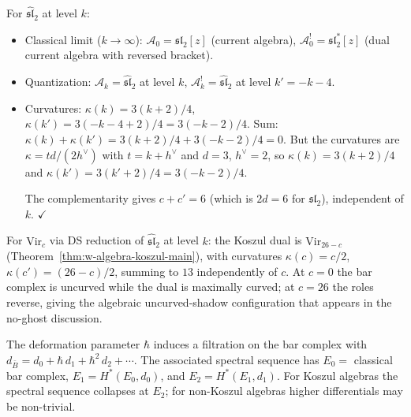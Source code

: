 \begin{computation}
\label{comp:dq-koszul-km}

For $\widehat{\mathfrak{sl}}_2$ at level $k$:
\begin{itemize}
\item Classical limit ($k \to \infty$):
$\mathcal{A}_0 = \mathfrak{sl}_2[z]$ (current algebra),
$\mathcal{A}_0^! = \mathfrak{sl}_2^*[z]$
(dual current algebra with reversed bracket).
\item Quantization: $\mathcal{A}_k = \widehat{\mathfrak{sl}}_2$ at
level $k$, $\mathcal{A}_k^! = \widehat{\mathfrak{sl}}_2$ at
level $k' = -k-4$.
\item Curvatures: $\kappa(k) = 3(k+2)/4$, $\kappa(k') = 3(-k-4+2)/4 = 3(-k-2)/4$.
Sum: $\kappa(k) + \kappa(k') = 3(k+2)/4 + 3(-k-2)/4 = 0$.
But the curvatures are $\kappa = td/(2h^\vee)$ with $t = k + h^\vee$
and $d = 3$, $h^\vee = 2$, so $\kappa(k) = 3(k+2)/4$ and
$\kappa(k') = 3(k'+2)/4 = 3(-k-2)/4$.

The complementarity gives $c + c' = 6$ (which is $2d = 6$ for
$\mathfrak{sl}_2$), independent of $k$. $\checkmark$
\end{itemize}
\end{computation}

\begin{computation}
\label{comp:dq-koszul-vir}
For $\mathrm{Vir}_c$ via DS reduction of $\widehat{\mathfrak{sl}}_2$ at level $k$: the Koszul dual is $\mathrm{Vir}_{26-c}$ (Theorem~\ref{thm:w-algebra-koszul-main}), with curvatures $\kappa(c)=c/2$, $\kappa(c')=(26-c)/2$, summing to $13$ independently of $c$. At $c=0$ the bar complex is uncurved while the dual is maximally curved; at $c=26$ the roles reverse, giving the algebraic uncurved-shadow configuration that appears in the no-ghost discussion.
\end{computation}

\begin{remark}
\label{rem:filtered-dq}
The deformation parameter $\hbar$ induces a filtration on the bar complex with $d_{\bar{B}} = d_0 + \hbar\, d_1 + \hbar^2\, d_2 + \cdots$. The associated spectral sequence has $E_0 =$ classical bar complex, $E_1 = H^*(E_0, d_0)$, and $E_2 = H^*(E_1, d_1)$. For Koszul algebras the spectral sequence collapses at $E_2$; for non-Koszul algebras higher differentials may be non-trivial.
\end{remark}


